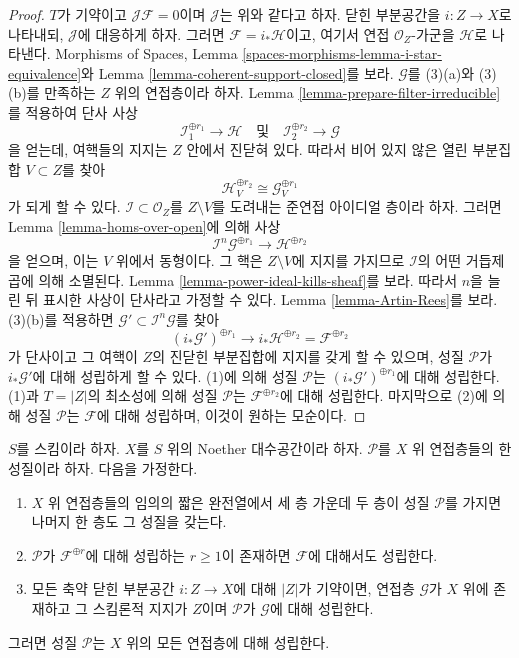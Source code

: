\begin{proof}
\medskip\noindent
$T$가 기약이고 $\mathcal{J}\mathcal{F} = 0$이며 $\mathcal{J}$는
위와 같다고 하자.
닫힌 부분공간을 $i : Z \to X$로 나타내되, $\mathcal{J}$에 대응하게 하자.
그러면 $\mathcal{F} = i_*\mathcal{H}$이고, 여기서 연접
$\mathcal{O}_Z$-가군을 $\mathcal{H}$로 나타낸다. Morphisms of Spaces, Lemma
\ref{spaces-morphisms-lemma-i-star-equivalence}와 Lemma
\ref{lemma-coherent-support-closed}를 보라.
$\mathcal{G}$를 (3)(a)와 (3)(b)를 만족하는 $Z$ 위의 연접층이라 하자.
Lemma \ref{lemma-prepare-filter-irreducible}를 적용하여 단사 사상
$$
\mathcal{I}_1^{\oplus r_1} \to \mathcal{H}
\quad\text{및}\quad
\mathcal{I}_2^{\oplus r_2} \to \mathcal{G}
$$
을 얻는데, 여핵들의 지지는 $Z$ 안에서 진닫혀 있다. 따라서
비어 있지 않은 열린 부분집합 $V \subset Z$를 찾아
$$
\mathcal{H}^{\oplus r_2}_V \cong \mathcal{G}^{\oplus r_1}_V
$$
가 되게 할 수 있다.
$\mathcal{I} \subset \mathcal{O}_Z$를 $Z \setminus V$를 도려내는
준연접 아이디얼 층이라 하자. 그러면 Lemma
\ref{lemma-homs-over-open}에 의해 사상
$$
\mathcal{I}^n\mathcal{G}^{\oplus r_1} \longrightarrow \mathcal{H}^{\oplus r_2}
$$
을 얻으며, 이는 $V$ 위에서 동형이다. 그 핵은 $Z \setminus V$에
지지를 가지므로 $\mathcal{I}$의 어떤 거듭제곱에 의해 소멸된다.
Lemma \ref{lemma-power-ideal-kills-sheaf}를 보라. 따라서 $n$을 늘린 뒤
표시한 사상이 단사라고 가정할 수 있다. Lemma
\ref{lemma-Artin-Rees}를 보라. (3)(b)를 적용하면
$\mathcal{G}' \subset \mathcal{I}^n\mathcal{G}$를 찾아
$$
(i_*\mathcal{G}')^{\oplus r_1} \longrightarrow
i_*\mathcal{H}^{\oplus r_2} = \mathcal{F}^{\oplus r_2}
$$
가 단사이고 그 여핵이 $Z$의 진닫힌 부분집합에 지지를 갖게 할 수 있으며,
성질 $\mathcal{P}$가 $i_*\mathcal{G}'$에 대해 성립하게 할 수 있다.
(1)에 의해 성질 $\mathcal{P}$는 $(i_*\mathcal{G}')^{\oplus r_1}$에 대해
성립한다. (1)과 $T = |Z|$의 최소성에 의해 성질 $\mathcal{P}$는
$\mathcal{F}^{\oplus r_2}$에 대해 성립한다. 마지막으로 (2)에 의해
성질 $\mathcal{P}$는 $\mathcal{F}$에 대해 성립하며, 이것이 원하는
모순이다.
\end{proof}

\begin{lemma}
\label{lemma-property-higher-rank-cohomological-variant}
$S$를 스킴이라 하자. $X$를 $S$ 위의 Noether 대수공간이라 하자.
$\mathcal{P}$를 $X$ 위 연접층들의 한 성질이라 하자. 다음을 가정한다.
\begin{enumerate}
\item $X$ 위 연접층들의 임의의 짧은 완전열에서 세 층 가운데 두 층이
성질 $\mathcal{P}$를 가지면 나머지 한 층도 그 성질을 갖는다.
\item $\mathcal{P}$가 $\mathcal{F}^{\oplus r}$에 대해 성립하는
$r \geq 1$이 존재하면 $\mathcal{F}$에 대해서도 성립한다.
\item 모든 축약 닫힌 부분공간 $i : Z \to X$에 대해 $|Z|$가 기약이면,
연접층 $\mathcal{G}$가 $X$ 위에 존재하고 그 스킴론적 지지가 $Z$이며
$\mathcal{P}$가 $\mathcal{G}$에 대해 성립한다.
\end{enumerate}
그러면 성질 $\mathcal{P}$는 $X$ 위의 모든 연접층에 대해 성립한다.
\end{lemma}

